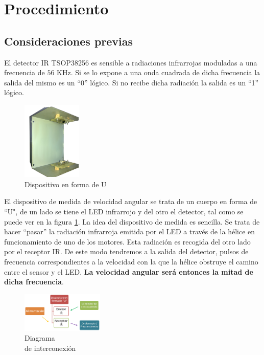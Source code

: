 \documentclass[main]{subfiles}
\begin{document}
\section{Procedimiento}


\subsection{Consideraciones previas}
\label{sec:test_motores--disp-forma-u}

El detector IR TSOP38256 es sensible a radiaciones infrarrojas moduladas a una frecuencia de $56$ KHz. Si se lo expone a una onda cuadrada de dicha frecuencia la salida del mismo es un ``0'' l\'ogico. Si no recibe dicha radiaci\'on la salida es un ``1'' l\'ogico.\\
\begin{figure}
  \begin{center}
    \includegraphics[width=0.25\textwidth]{./pics_motores/u.jpg}
  \end{center}
  \caption{Dispositivo en forma de U}
  \label{fig:u}
\end{figure}
El dispositivo de medida de velocidad angular se trata de un cuerpo en forma de ``U", de un lado se tiene el LED infrarrojo y del otro el detector, tal como se puede ver en la figura \ref{fig:u}.
La idea del dispositivo de medida es sencilla. Se trata de hacer ``pasar'' la radiaci\'on infrarroja emitida por el LED a trav\'es de la h\'elice en funcionamiento de uno de los motores. Esta radiaci\'on es recogida del otro lado por el receptor IR. De este modo tendremos a la salida del detector, pulsos de frecuencia correspondientes a la velocidad con la que la h\'elice obstruye el camino entre el sensor y el LED. \textbf{La velocidad angular ser\'a entonces la mitad de dicha frecuencia}.\\

\begin{figure}
  \begin{center}
  \vspace{-20pt}
    \includegraphics[width=0.35\textwidth]{./pics_motores/dispositivoU.png}
  \end{center}
  \vspace{-10pt}
  \caption{Diagrama \\de interconexión}
    \vspace{-10pt}
  \label{fig:diagrama_u}
\end{figure}
\end{document}
